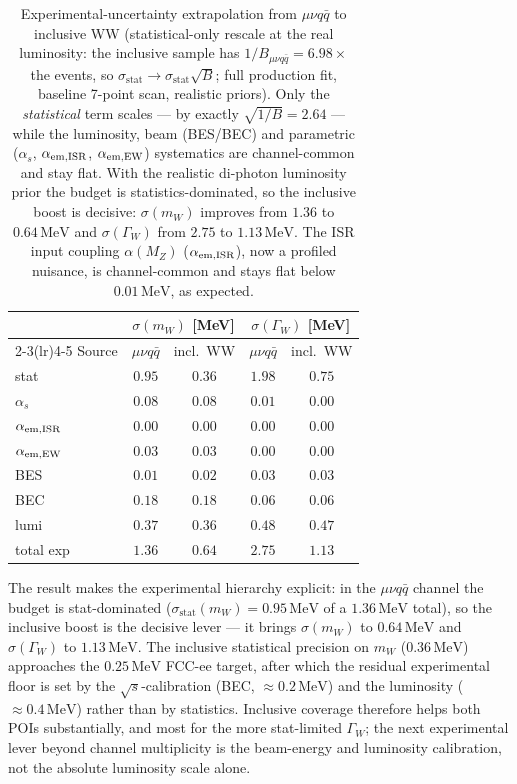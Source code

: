 \documentclass[11pt,a4paper]{article}
\newcommand{\mW}{m_W}
\newcommand{\GammaW}{\Gamma_W}
\newcommand{\MeV}{\ensuremath{\,\mathrm{MeV}}}
\begin{document}
\begin{table}[h]
\centering
\caption{Experimental-uncertainty extrapolation from $\mu\nu q\bar q$ to
inclusive WW (statistical-only rescale at the real luminosity: the inclusive
sample has $1/B_{\mu\nu q\bar q}=6.98\times$ the events, so $\sigma_\text{stat}
\to\sigma_\text{stat}\sqrt{B}$; full production fit, baseline 7-point scan,
realistic priors). Only the \emph{statistical} term scales --- by exactly
$\sqrt{1/B}=2.64$ --- while the luminosity, beam (BES/BEC) and parametric
($\alpha_s$, $\alpha_{\rm em,ISR}$, $\alpha_{\rm em,EW}$) systematics are
channel-common and stay flat. With the realistic di-photon luminosity prior the budget is
statistics-dominated, so the inclusive boost is decisive: $\sigma(\mW)$ improves
from $1.36$ to $0.64\MeV$ and $\sigma(\GammaW)$ from $2.75$ to $1.13\MeV$. The
ISR input coupling $\alpha(M_Z)$ ($\alpha_{\rm em,ISR}$), now a profiled
nuisance, is channel-common and stays flat below $0.01\MeV$, as expected.}
\label{tab:channel-extrap}
\begin{tabular}{l c c c c}
\toprule
 & \multicolumn{2}{c}{$\sigma(\mW)$ [MeV]} & \multicolumn{2}{c}{$\sigma(\GammaW)$ [MeV]} \\
\cmidrule(lr){2-3}\cmidrule(lr){4-5}
Source & $\mu\nu q\bar q$ & incl.\ WW & $\mu\nu q\bar q$ & incl.\ WW \\
\midrule
stat       & $0.95$ & $0.36$ & $1.98$ & $0.75$ \\
$\alpha_s$ & $0.08$ & $0.08$ & $0.01$ & $0.00$ \\
$\alpha_{\rm em,ISR}$ & $0.00$ & $0.00$ & $0.00$ & $0.00$ \\
$\alpha_{\rm em,EW}$ & $0.03$ & $0.03$ & $0.00$ & $0.00$ \\
BES        & $0.01$ & $0.02$ & $0.03$ & $0.03$ \\
BEC        & $0.18$ & $0.18$ & $0.06$ & $0.06$ \\
lumi       & $0.37$ & $0.36$ & $0.48$ & $0.47$ \\
\midrule
total exp  & $1.36$ & $0.64$ & $2.75$ & $1.13$ \\
\bottomrule
\end{tabular}
\end{table}

The result makes the experimental hierarchy explicit: in the $\mu\nu q\bar q$
channel the budget is stat-dominated ($\sigma_\text{stat}(\mW)=0.95\MeV$ of a
$1.36\MeV$ total), so the inclusive boost is the decisive lever --- it brings
$\sigma(\mW)$ to $0.64\MeV$ and $\sigma(\GammaW)$ to $1.13\MeV$. The inclusive
statistical precision on $\mW$ ($0.36\MeV$) approaches the $0.25\MeV$ FCC-ee
target, after which the residual experimental floor is set by the
$\sqrt s$-calibration (BEC, $\approx0.2\MeV$) and the luminosity
($\approx0.4\MeV$) rather than by statistics. Inclusive coverage therefore
helps both POIs substantially, and most for the more stat-limited $\GammaW$;
the next experimental lever beyond channel multiplicity is the beam-energy
and luminosity calibration, not the absolute luminosity scale alone.
\end{document}

